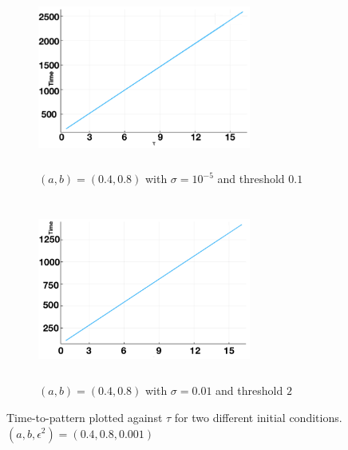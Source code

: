 \begin{figure}[H]
    \centering
    \begin{subfigure}[b]{0.45\textwidth}
        \centering
        \includegraphics[width=7cm,height=6cm]{longlin3.png}
        \caption{$(a,b)=(0.4,0.8)$ with $\sigma=10^{-5}$ and threshold $0.1$}
        \label{fig:linperturb2a}
    \end{subfigure}
    \hfill
    \begin{subfigure}[b]{0.45\textwidth}
        \centering
        \includegraphics[width=7cm,height=6cm]{longlin4.png}
        \caption{$(a,b)=(0.4,0.8)$ with $\sigma=0.01$ and threshold $2$}
        \label{fig:linperturb2b}
    \end{subfigure}
    \caption{Time-to-pattern plotted against $\tau$ for two different initial conditions. $(a,b,\epsilon^2)=(0.4,0.8,0.001)$}
    \label{}
\end{figure}

